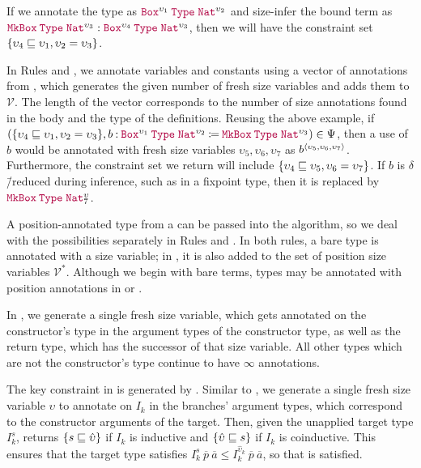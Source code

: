 If we annotate the type as $\app{\Box^{\upsilon_1}}{\Type{}}{\Nat^{\upsilon_2}}$ and size-infer the bound term as $\app{\MkBox}{\Type{}}{\Nat^{\upsilon_3}} : \app{\Box^{\upsilon_4}}{\Type{}}{\Nat^{\upsilon_3}}$, then we will have the constraint set $\{\upsilon_4 \sqsubseteq \upsilon_1, \upsilon_2 = \upsilon_3\}$.

In Rules  and , we annotate variables and constants using a vector of annotations from \fresh, which generates the given number of fresh size variables and adds them to $\mathcal{V}$.
The length of the vector corresponds to the number of size annotations found in the body and the type of the definitions.
Reusing the above example, if $(\set{\upsilon_4 \sqsubseteq \upsilon_1, \upsilon_2 = \upsilon_3}, \defn{b}{\app{\Box^{\upsilon_1}}{\Type{}}{\Nat^{\upsilon_2}}}{\app{\MkBox}{\Type{}}{\Nat^{\upsilon_3}}}) \in \Psi$, then a use of $b$ would be annotated with fresh size variables $\upsilon_5, \upsilon_6, \upsilon_7$ as $b^{\langle\upsilon_5, \upsilon_6, \upsilon_7\rangle}$.
Furthermore, the constraint set we return will include $\{\upsilon_4 \sqsubseteq \upsilon_5, \upsilon_6 = \upsilon_7\}$.
If $b$ is $\delta$\=/reduced during inference, such as in a fixpoint type, then it is replaced by $\app{\MkBox}{\Type{}}{\Nat^\upsilon_7}$.

A position-annotated type from a \cofixpoint can be passed into the algorithm, so we deal with the possibilities separately in Rules  and .
In both rules, a bare \coinductive type is annotated with a size variable; in , it is also added to the set of position size variables $\mathcal{V}^*$.
Although we begin with bare terms, \coinductive types may be annotated with position annotations in  or .

In , we generate a single fresh size variable, which gets annotated on the constructor's \coinductive type in the argument types of the constructor type, as well as the return type, which has the successor of that size variable.
All other \coinductive types which are not the constructor's \coinductive type continue to have $\infty$ annotations.

The key constraint in  is generated by \casesize.
Similar to , we generate a single fresh size variable $\upsilon$ to annotate on $I_k$ in the branches' argument types, which correspond to the constructor arguments of the target.
Then, given the unapplied target type $I_k^s$, \casesize returns $\{s \sqsubseteq \hat{\upsilon}\}$ if $I_k$ is inductive and $\{\hat{\upsilon} \sqsubseteq s\}$ if $I_k$ is coinductive.
This ensures that the target type satisfies $I_k^s ~ \overline{p} ~ \overline{a} \leq I_k^{\hat{\upsilon}_k} ~ \overline{p} ~ \overline{a}$, so that  is satisfied.

